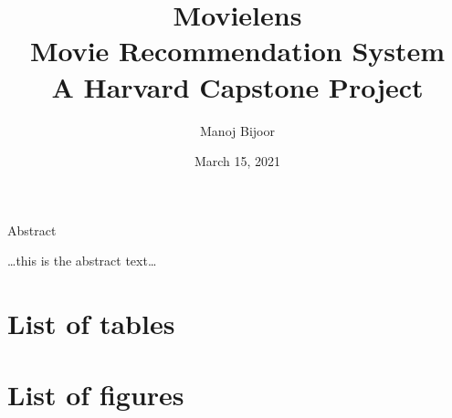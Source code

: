 \documentclass[
]{article}
\title{Movielens\\
Movie Recommendation System\\
A Harvard Capstone Project}
\author{Manoj Bijoor}
\date{March 15, 2021}
\begin{document}
\maketitle



\newpage

\newpage

\begin{center}

\hypertarget{Abstract}{}
\large{Abstract}

\end{center}

\bigskip

\ldots this is the abstract text\ldots{}

\newpage 
\clearpage
{}
\setcounter{secnumdepth}{5}
\setcounter{tocdepth}{5}

\cleardoublepage  \hypertarget{toc}{}
\bookmark[dest=toc,level=chapter]{\contentsname} \tableofcontents

\clearpage

\newpage
\clearpage
{}

\hypertarget{list-of-tables}{%
\section*{List of tables}\label{list-of-tables}}

\renewcommand{\listtablename}{}

\listoftables
\clearpage

\newpage
\clearpage
{}

\hypertarget{list-of-figures}{%
\section*{List of figures}\label{list-of-figures}}

\renewcommand{\listfigurename}{}

\listoffigures
\clearpage

\newpage
\clearpage
{}
\newcommand{\listequationsname}{List of Equations}
\newcommand{\equations}[1]{%
\refstepcounter{equations}
\addcontentsline{equ}{equations}{ \protect\numberline{\theequations}#1}\par}
\end{document}

